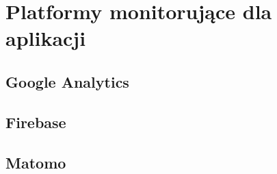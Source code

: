 \section{Platformy monitorujące dla aplikacji}

\subsection{Google Analytics}

\subsection{Firebase}

\subsection{Matomo}

